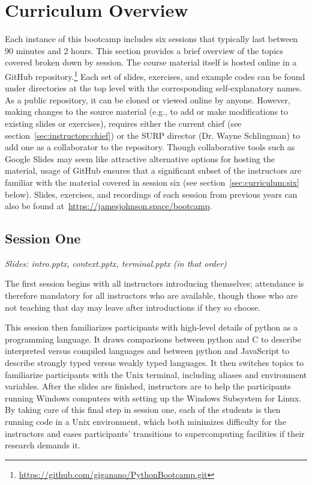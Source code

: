 
\section{Curriculum Overview}
\label{sec:curriculum}
\noindent
Each instance of this bootcamp includes six sessions that typically last
between 90 minutes and 2 hours.
This section provides a brief overview of the topics covered broken down by
session.
The course material itself is hosted online in a GitHub repository.\footnote{
	\url{https://github.com/giganano/PythonBootcamp.git}
}
Each set of slides, exercises, and example codes can be found under directories
at the top level with the corresponding self-explanatory names.
As a public repository, it can be cloned or viewed online by anyone.
However, making changes to the source material (e.g., to add or make
modifications to existing slides or exercises), requires either the current
chief (see section~\ref{sec:instructors:chief}) or the SURP director (Dr. Wayne
Schlingman) to add one as a collaborator to the repository.
Though collaborative tools such as Google Slides may seem like attractive
alternative options for hosting the material, usage of GitHub ensures that a
significant subset of the instructors are familiar with the material covered in
session six (see section~\ref{sec:curriculum:six} below).
Slides, exercises, and recordings of each session from previous years can also
be found at~\url{https://jamesjohnson.space/bootcamp}.

\subsection{Session One}
\label{sec:curriculum:one}
\noindent
\textit{Slides: intro.pptx, context.pptx, terminal.pptx (in that order)}
\par\noindent
The first session begins with all instructors introducing themselves;
attendance is therefore mandatory for all instructors who are available, though
those who are not teaching that day may leave after introductions if they so
choose.
\par
This session then familiarizes participants with high-level details of
python as a programming language.
It draws comparisons between python and C to describe interpreted versus
compiled languages and between python and JavaScript to describe strongly typed
versus weakly typed languages.
It then switches topics to familiarize participants with the Unix terminal,
including aliases and environment variables.
After the slides are finished, instructors are to help the participants running
Windows computers with setting up the Windows Subsystem for Linux.
By taking care of this final step in session one, each of the students is then
running code in a Unix environment, which both minimizes difficulty for the
instructors and eases participants' transitions to supercomputing facilities if
their research demands it.

